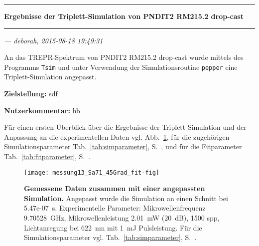 \documentclass{article}
\begin{document}
\thispagestyle{empty}

\vspace*{-1.5cm}

\noindent\rule[1.5ex]{\textwidth}{1pt}

\begin{sffamily}\bfseries\large
Ergebnisse der Triplett-Simulation von PNDIT2 RM215.2 drop-cast
\end{sffamily}

\noindent\rule{\textwidth}{1pt}

\begin{flushright}\slshape
--- deborah, 2015-08-18 19:49:31
\end{flushright}

\vspace*{1.5em}

An das TREPR-Spektrum von PNDIT2 RM215.2 drop-cast wurde mittels des Programms \texttt{Tsim} und unter Verwendung der Simulationsroutine \texttt{pepper} eine Triplett-Simulation angepasst.


\textbf{Zielstellung:} sdf

\textbf{Nutzerkommentar:} hb


Für einen ersten Überblick über die Ergebnisse der Triplett-Simulation und der Anpassung an die experimentellen Daten vgl. Abb.~\ref{fig:ergebnisse}, für die zugehörigen Simulationsparameter Tab.~\ref{tab:simparameter}, S.~\pageref{tab:simparameter}, und für die Fitparameter Tab.~\ref{tab:fitparameter}, S.~\pageref{tab:fitparameter}.


\begin{figure}[h]
\centering

\texttt{[image: messung13\_Sa71\_45Grad\_fit-fig]}

\caption{\textbf{Gemessene Daten zusammen mit einer angepassten Simulation.} Angepasst wurde die Simulation an einen Schnitt bei 5.47e-07~s. Experimentelle Parameter: Mikrowellenfrequenz  9.70528~GHz, Mikrowellenleistung  2.01~mW (20~dB), 1500 spp, Lichtanregung bei 622~nm mit   1~mJ Pulsleistung. Für die Simulationsparameter vgl. Tab.~\ref{tab:simparameter}, S.~\pageref{tab:simparameter}.}
\label{fig:ergebnisse}
\end{figure}

\begin{center}
\setlength{\fboxsep}{1.5ex}\setlength{\fboxrule}{.75pt}
\end{center}
\end{document}
